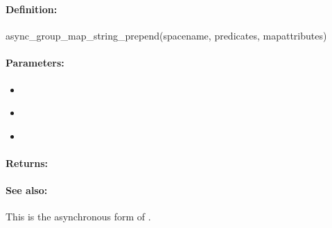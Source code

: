 \pagebreak
\subsubsection{}
\label{api:ruby:async_group_map_string_prepend}


\paragraph{Definition:}
\begin{rubycode}
async_group_map_string_prepend(spacename, predicates, mapattributes)
\end{rubycode}

\paragraph{Parameters:}
\begin{itemize}[noitemsep]
\item {}\\

\item {}\\

\item {}\\

\end{itemize}

\paragraph{Returns:}


\paragraph{See also:}  This is the asynchronous form of .

\pagebreak
\subsubsection{}
\label{api:ruby:map_string_append}


